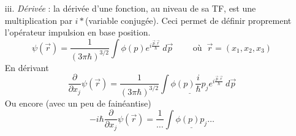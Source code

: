 \begin{itemize}
	\item[iii.] \textit{Dérivée }: la dérivée d'une fonction, au niveau de sa TF, est une multiplication 
	par $i*$(variable conjugée). Ceci permet de définir proprement l'opérateur impulsion en base 
	position.
	\begin{equation}
	\psi(\vec{r}) = \frac{1}{(3\pi\hbar)^{3/2}}\int\phi(p)e^{i\frac{\vec{p}.\vec{r}}{\hbar}}\ d\vec{p}\qquad
	\text{ où }\ \vec{r} = (x_1,x_2,x_3)
	\end{equation}
	En dérivant
	\begin{equation}
	\frac{\partial}{\partial x_j} \psi(\vec{r}) = \frac{1}{(3\pi\hbar)^{3/2}}\int\underline{\phi(p)\frac{i}
	{\hbar} p_j}	e^{i\frac{\vec{p}.\vec{r}}{\hbar}}\ d\vec{p}
	\end{equation}
	Ou encore (avec un peu de fainéantise)
	\begin{equation}
	-i\hbar\dfrac{\partial}{\partial x_j} \psi(\vec{r}) = \frac{1}{\dots}\int \underline{\phi(p)p_j}\dots
	\end{equation}
	\end{itemize}

